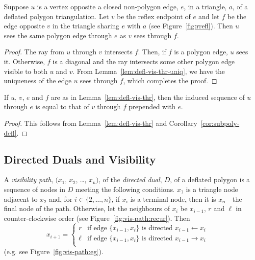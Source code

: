 \documentclass[11pt]{amsart}
\begin{document}
\begin{lemma}
  \label{lem:defl-vis-thr}
  Suppose $u$ is a vertex opposite a closed non-polygon edge, $e$, in
  a triangle, $a$, of a deflated polygon triangulation.  Let $v$ be
  the reflex endpoint of $e$ and let $f$ be the edge opposite $v$ in
  the triangle sharing $e$ with $a$ (see Figure~\ref{fig:rrefl}).
  Then $u$ sees the same polygon edge through $e$ as $v$ sees through
  $f$.
\end{lemma}
\begin{proof}
  The ray from $u$ through $v$ intersects $f$.  Then, if $f$ is a
  polygon edge, $u$ sees it.  Otherwise, $f$ is a diagonal and the ray
  intersects some other polygon edge visible to both $u$ and $v$.
  From Lemma~\ref{lem:defl-vis-thr-uniq}, we have the uniqueness of
  the edge $u$ sees through $f$, which completes the proof.
\end{proof}

\begin{corollary}
  \label{cor:ind-path-rec}
  If $u$, $v$, $e$ and $f$ are as in Lemma~\ref{lem:defl-vis-thr},
  then the induced sequence of $u$ through $e$ is equal to that of $v$
  through $f$ prepended with $e$.
\end{corollary}
\begin{proof}
  This follows from Lemma~\ref{lem:defl-vis-thr} and
  Corollary~\ref{cor:subpoly-defl}.
\end{proof}


\subsection{Directed Duals and Visibility}

A \emph{visibility path}, $(x_1$, $x_2$, \ldots, $x_n)$, of
the \emph{directed dual}, $D$, of a deflated polygon is a sequence of
nodes in $D$ meeting the following conditions.  $x_1$ is a triangle
node adjacent to $x_2$ and, for $i\in\{2,\ldots,n\}$, if $x_i$ is a
terminal node, then it is $x_n$---the final node of the path.
Otherwise, let the neighbours of $x_i$ be $x_{i-1}$, $r$ and $\ell$ in
counter-clockwise order (see Figure~\ref{fig:vis-path:recur}).  Then
\[ x_{i+1} = 
\begin{cases}
  r & \text{if edge $\{x_{i-1}, x_i\}$ is directed $x_{i-1}\leftarrow x_i$} \\
  \ell & \text{if edge $\{x_{i-1}, x_i\}$ is directed $x_{i-1}\rightarrow x_i$} \\
\end{cases}
\]
(e.g. see Figure~\ref{fig:vis-path:eg}).
\end{document}
